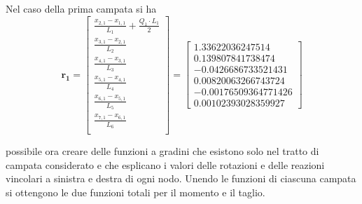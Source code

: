 Nel caso della prima campata si ha
\begin{equation}
\mathbf{r_1}=
\begin{bmatrix}
\frac{x_{2,1}-x_{1,1}}{L_1}+\frac{Q_1\cdot L_1}{2} \\
\frac{x_{3,1}-x_{2,1}}{L_2} \\
\frac{x_{4,1}-x_{3,1}}{L_3} \\
\frac{x_{5,1}-x_{4,1}}{L_4} \\
\frac{x_{6,1}-x_{5,1}}{L_5} \\
\frac{x_{7,1}-x_{6,1}}{L_6} \\
\end{bmatrix} =
\begin{bmatrix}
1.33622036247514 \\
0.139807841738474 \\
-0.0426686733521431 \\
0.00820063266743724 \\
-0.00176509364771426 \\
0.00102393028359927
\end{bmatrix}
\end{equation}

\e possibile ora creare delle funzioni a gradini che esistono solo nel tratto di campata considerato e che esplicano i valori delle rotazioni e delle reazioni vincolari a sinistra e destra di ogni nodo.
Unendo le funzioni di ciascuna campata si ottengono le due funzioni totali per il momento e il taglio.

